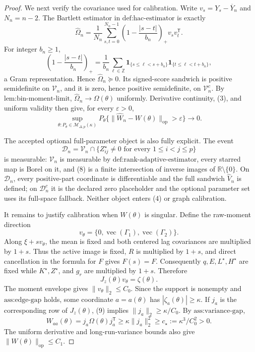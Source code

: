 \documentclass{article}
\begin{document}
\begin{proof}
We next verify the covariance used for calibration.  Write \(v_s=Y_s-\overline Y_n\) and \(N_n=n-2\).  The Bartlett estimator in \(\text{def:hac-estimator}\) is exactly
\[
 \widehat\Omega_n=\frac1{N_n}\sum_{s,t=0}^{N_n-1}
 \left(1-\frac{|s-t|}{b_n}\right)_+v_sv_t^{\mathsf T}.
\tag{5}
\]
For integer \(b_n\geq1\),
\[
 \left(1-\frac{|s-t|}{b_n}\right)_+
 =\frac1{b_n}\sum_{\ell\in\mathbb Z}
 \mathbf1_{\{s\leq\ell<s+b_n\}}
 \mathbf1_{\{t\leq\ell<t+b_n\}},
\tag{6}
\]
a Gram representation.  Hence \(\widehat\Omega_n\succeq0\).  Its signed-score sandwich is positive semidefinite on \(\mathcal V_n\), and it is zero, hence positive semidefinite, on \(\mathcal V_n^c\).  By \(\text{lem:bin-moment-limit}\), \(\widehat\Omega_n\to\Omega(\theta)\) uniformly.  Derivative continuity, (3), and uniform validity then give, for every \(\varepsilon>0\),
\[
 \sup_{\theta:P_\theta\in\mathcal M_{\Delta,p}(\kappa)}
 P_\theta\{\lVert\widehat W_n-W(\theta)\rVert_{\mathrm{op}}>\varepsilon\}
 \longrightarrow0.
\tag{7}
\]

The accepted optional full-parameter object is also fully explicit.  The event
\[
 \mathcal D_n=\mathcal V_n\cap
 \{Z_{ij}^\star\neq0\text{ for every }1\leq i<j\leq p\}
\tag{8}
\]
is measurable: \(\mathcal V_n\) is measurable by \(\text{def:rank-adaptive-estimator}\), every starred map is Borel on it, and (8) is a finite intersection of inverse images of \(\mathbb R\setminus\{0\}\).  On \(\mathcal D_n\), every positive-part coordinate is differentiable and the full sandwich \(\widehat V_n\) is defined; on \(\mathcal D_n^c\) it is the declared zero placeholder and the optional parameter set uses its full-space fallback.  Neither object enters (4) or graph calibration.

It remains to justify calibration when \(W(\theta)\) is singular.  Define the raw-moment direction
\[
 v_\theta=\{0,\operatorname{vec}(\Gamma_1),\operatorname{vec}(\Gamma_2)\}.
\]
Along \(\xi+s v_\theta\), the mean is fixed and both centered lag covariances are multiplied by \(1+s\).  Thus the active image is fixed, \(R\) is multiplied by \(1+s\), and direct cancellation in the formula for \(F\) gives \(F(s)=F\).  Consequently \(q,E,L^\star,H^\star\) are fixed while \(K^\star,Z^\star\), and \(g_r\) are multiplied by \(1+s\).  Therefore
\[
 J_z(\theta)v_\theta=\zeta(\theta).
\tag{9}
\]
The moment envelope gives \(\lVert v_\theta\rVert_2\leq C_0\).  Since the support is nonempty and \(\text{ass:edge-gap}\) holds, some coordinate \(a=a(\theta)\) has \(|\zeta_a(\theta)|\geq\kappa\).  If \(j_a\) is the corresponding row of \(J_z(\theta)\), (9) implies \(\lVert j_a\rVert_2\geq\kappa/C_0\).  By \(\text{ass:variance-gap}\),
\[
 W_{aa}(\theta)=j_a\Omega(\theta)j_a^{\mathsf T}
 \geq\kappa\lVert j_a\rVert_2^2
 \geq c_\star:=\kappa^3/C_0^2>0.
\tag{10}
\]
The uniform derivative and long-run-variance bounds also give \(\lVert W(\theta)\rVert_{\mathrm{op}}\leq C_1\).


\end{proof}
\end{document}
